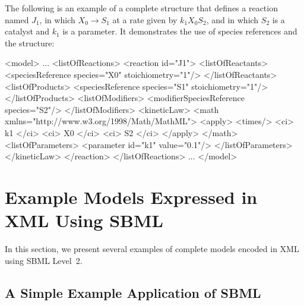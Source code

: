 \documentclass[10pt,twocolumntoc]{cekarticle}
\begin{document}
The following is an example of a complete  structure that
defines a reaction named $J_1$, in which $X_0 \longrightarrow S_1$ at a
rate given by $k_1 X_0 S_2$, and in which $S_2$ is a catalyst and $k_1$ is
a parameter.  It demonstrates the use of species references and the
 structure:
\begin{example}
<model>
    ...
    <listOfReactions>
        <reaction id="J1">
            <listOfReactants>
                <speciesReference species="X0" stoichiometry="1"/>
            </listOfReactants>
            <listOfProducts>
                <speciesReference species="S1" stoichiometry="1"/>
            </listOfProducts>
            <listOfModifiers>
                <modifierSpeciesReference species="S2"/>
            </listOfModifiers>
            <kineticLaw>
                <math xmlns="http://www.w3.org/1998/Math/MathML">
                    <apply>
                        <times/>
                        <ci> k1 </ci>
                        <ci> X0 </ci>
                        <ci> S2 </ci>
                    </apply>
                </math>
                <listOfParameters>
                    <parameter id="k1" value="0.1"/>
                </listOfParameters>
            </kineticLaw>
        </reaction>
    </listOfReactions>
    ...
</model>
\end{example}

\section{Example Models Expressed in XML Using SBML}
\label{sec:xml-rep}

In this section, we present several examples of complete models
encoded in XML using SBML Level~2.  



\subsection{A Simple Example Application of SBML}
\label{sec:modeleg}
\end{document}
